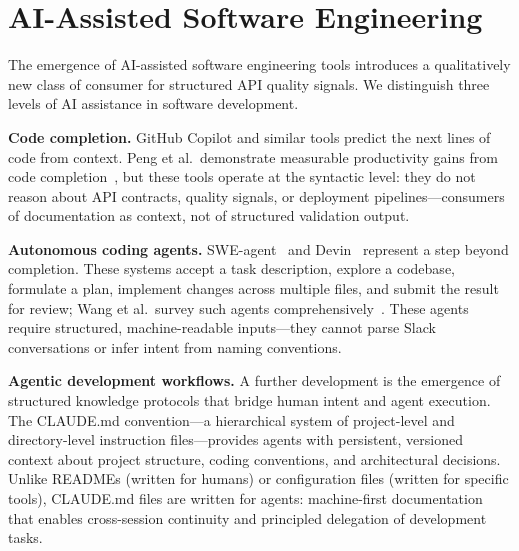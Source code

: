 \section{AI-Assisted Software Engineering}
\label{sec:ai-assisted-se}

The emergence of AI-assisted software engineering tools introduces a qualitatively new class of consumer for structured API quality signals. We distinguish three levels of AI assistance in software development.

\textbf{Code completion.} GitHub Copilot and similar tools predict the next lines of code from context. Peng et al.\ demonstrate measurable productivity gains from code completion~\cite{github-copilot-research}, but these tools operate at the syntactic level: they do not reason about API contracts, quality signals, or deployment pipelines---consumers of documentation as context, not of structured validation output.

\textbf{Autonomous coding agents.} SWE-agent~\cite{swe-agent} and Devin~\cite{devin-cognition} represent a step beyond completion. These systems accept a task description, explore a codebase, formulate a plan, implement changes across multiple files, and submit the result for review; Wang et al.\ survey such agents comprehensively~\cite{autonomous-agents-survey}. These agents require structured, machine-readable inputs---they cannot parse Slack conversations or infer intent from naming conventions.

\textbf{Agentic development workflows.} A further development is the emergence of structured knowledge protocols that bridge human intent and agent execution. The CLAUDE.md convention---a hierarchical system of project-level and directory-level instruction files---provides agents with persistent, versioned context about project structure, coding conventions, and architectural decisions. Unlike READMEs (written for humans) or configuration files (written for specific tools), CLAUDE.md files are written for agents: machine-first documentation that enables cross-session continuity and principled delegation of development tasks.

